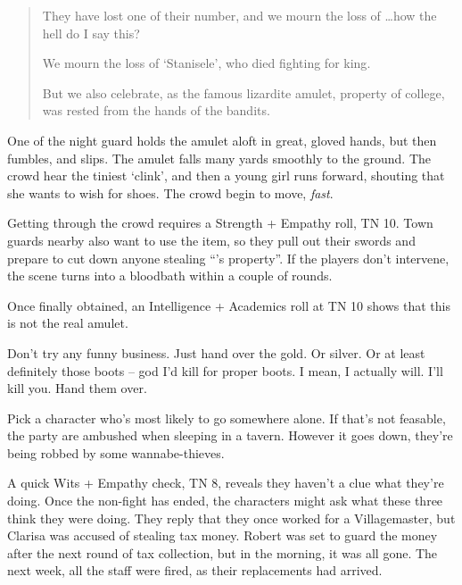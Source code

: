 \begin{multicols}{2}
\begin{boxtext}
\begin{quotation}
		They have lost one of their number, and we mourn the loss of \ldots how the hell do I say this?

		We mourn the loss of `Stanisele', who died fighting for \gls{king}.

		But we also celebrate, as the famous lizardite amulet, property of \gls{college}, was rested from the hands of the bandits.

	\end{quotation}

	One of the night guard holds the amulet aloft in great, gloved hands, but then fumbles, and slips.  The amulet falls many yards smoothly to the ground.  The crowd hear the tiniest `clink', and then a young girl runs forward, shouting that she wants to wish for shoes.  The crowd begin to move, \emph{fast}.

\end{boxtext}

Getting through the crowd requires a Strength + Empathy roll, TN 10.
Town guards nearby also want to use the item, so they pull out their swords and prepare to cut down anyone stealing ``'s property''.
If the players don't intervene, the scene turns into a bloodbath within a couple of rounds.

Once finally obtained, an Intelligence + Academics roll at TN 10 shows that this is not the real amulet.


\begin{speechtext}

	Don't try any funny business.  Just hand over the gold. Or silver.  Or at least definitely those boots -- god I'd kill for proper boots.  I mean, I actually will.  I'll kill you.  Hand them over.

\end{speechtext}

Pick a character who's most likely to go somewhere alone.  If that's not feasable, the party are ambushed when sleeping in a tavern.  However it goes down, they're being robbed by some wannabe-thieves.

A quick Wits + Empathy check, TN 8, reveals they haven't a clue what they're doing.  Once the non-fight has ended, the characters might ask what these three think they were doing.  They reply that they once worked for a Villagemaster, but Clarisa was accused of stealing tax money.  Robert was set to guard the money after the next round of tax collection, but in the morning, it was all gone.  The next week, all the staff were fired, as their replacements had arrived.


\end{multicols}
